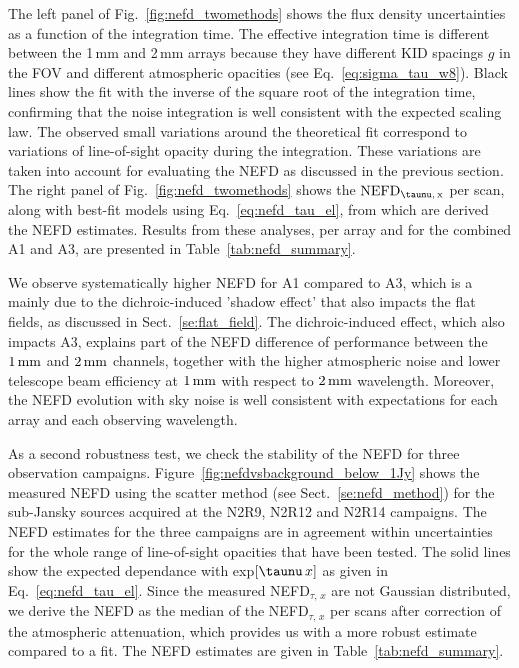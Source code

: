 The left panel of Fig.~\ref{fig:nefd_twomethods} shows the flux density
uncertainties as a function of the integration time. The effective
integration time is different between the 1\,mm and 2\,mm arrays
because they have different KID spacings $g$ in the FOV and different
atmospheric opacities (see Eq.~\ref{eq:sigma_tau_w8}). Black lines show
the fit with the inverse of the square root of the integration time,
confirming that the noise integration is well consistent with the expected
scaling law. The observed small variations around the theoretical fit
correspond to variations of line-of-sight opacity during the
integration. These variations are taken into account for evaluating the NEFD as
discussed in the previous section. The right panel of
Fig.~\ref{fig:nefd_twomethods} shows the
$\rm{NEFD}_{\taunu,\, x}$ per scan, along with best-fit models using
Eq.~\ref{eq:nefd_tau_el}, from which are derived the \rm{NEFD} estimates. 
Results from these analyses, per array and for the
combined A1 and A3, are presented in Table~\ref{tab:nefd_summary}.

We observe systematically higher NEFD for A1 compared to A3, which is a mainly
due to the dichroic-induced 'shadow effect' that also impacts the flat fields,
as discussed in Sect.~\ref{se:flat_field}.  The dichroic-induced effect, which
also impacts A3, explains part of the NEFD difference of performance between the $1\, \rm{mm}$
and $2\, \rm{mm}$ channels, together with the higher atmospheric noise and lower
telescope beam efficiency at $1\, \rm{mm}$ with respect to $2\,\rm{mm}$
wavelength. Moreover, the NEFD evolution with sky noise is well
consistent with expectations for each array and each observing wavelength.

As a second robustness test, we check the stability of the NEFD for
three observation campaigns. Figure~\ref{fig:nefdvsbackground_below_1Jy} shows the
measured NEFD using the scatter method (see Sect.~\ref{se:nefd_method}) for the
sub-Jansky sources acquired at the N2R9, N2R12 and N2R14
campaigns. The NEFD estimates for the
three campaigns are in agreement within uncertainties for the whole
range of line-of-sight opacities that have been tested.
The solid lines show the expected dependance with
exp${[\taunu\,x]}$ as given in Eq.~\ref{eq:nefd_tau_el}. %
Since the measured NEFD$_{\tau,\, x}$ are not Gaussian distributed, we
derive the NEFD as the median of the NEFD$_{\tau,\, x}$
per scans after correction of the atmospheric attenuation, which provides us
with a more robust estimate compared to a fit. The NEFD estimates
are given in Table~\ref{tab:nefd_summary}.

